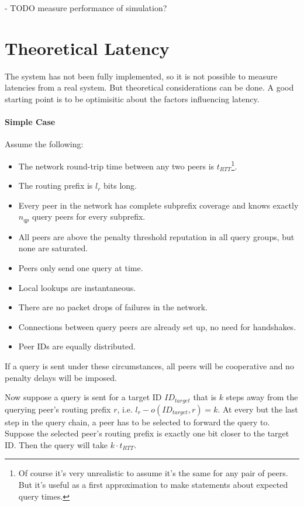 - TODO measure performance of simulation?

\section{Theoretical Latency}
The system has not been fully implemented, so it is not possible to measure
latencies from a real system. But theoretical considerations can be done. A good
starting point is to be optimisitic about the factors influencing latency.

\paragraph{Simple Case}
Assume the following:

\begin{itemize}
\item The network round-trip time between any two peers is
$t_{RTT}$\footnote{Of course it's very unrealistic to assume it's the same for
any pair of peers. But it's useful as a first approximation to make statements
about expected query times.}.
\item The routing prefix is $l_{r}$ bits long.
\item Every peer in the network has complete subprefix coverage and knows
exactly $n_{qp}$ query peers for every subprefix.
\item All peers are above the penalty threshold reputation in all query groups,
but none are saturated.
\item Peers only send one query at time.
\item Local lookups are instantaneous.
\item There are no packet drops of failures in the network.
\item Connections between query peers are already set up, no need for
handshakes.
\item Peer IDs are equally distributed.
\end{itemize}

If a query is sent under these circumstances, all peers will be cooperative and
no penalty delays will be imposed.

Now suppose a query is sent for a target ID $ID_{target}$ that is $k$ steps away
from the querying peer's routing prefix $r$, i.e. $l_{r} - o(ID_{target}, r) =
k$. At every but the last step in the query chain, a peer has to be selected to
forward the query to. Suppose the selected peer's routing prefix is exactly one
bit closer to the target ID. Then the query will take $k \cdot t_{RTT}$.

